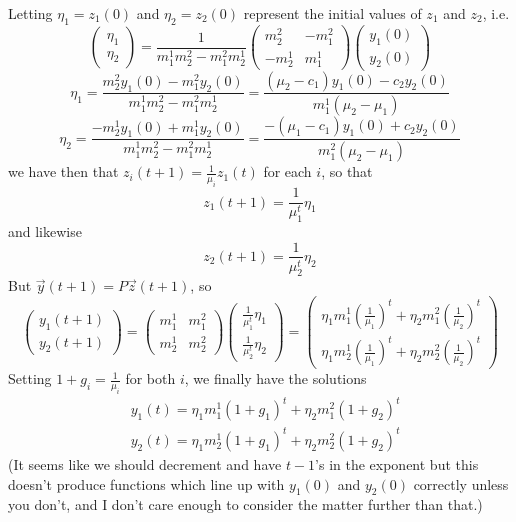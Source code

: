 \documentclass{article}
\theoremstyle{definition}
\theoremstyle{plain}
\theoremstyle{theorem}
\begin{document}
Letting $\eta_1 = z_1(0)$ and $\eta_2 = z_2(0)$ represent the initial values of $z_1$ and $z_2$, i.e.
\[ \begin{pmatrix} \eta_1 \\ \eta_2 \end{pmatrix} = \frac{1}{m^1_1m^2_2-m^2_1m^1_2} \begin{pmatrix} m^2_2 & -m^2_1 \\ -m^1_2 & m^1_1 \end{pmatrix} \begin{pmatrix} y_1(0) \\ y_2(0) \end{pmatrix} \]
\[ \eta_1 = \frac{m^2_2y_1(0)-m^2_1y_2(0)}{m^1_1m^2_2-m^2_1m^1_2} = \frac{(\mu_2-c_1)y_1(0)-c_2y_2(0)}{m^1_1(\mu_2-\mu_1)} \]
\[ \eta_2 = \frac{-m^1_2y_1(0)+m^1_1y_2(0)}{m^1_1m^2_2-m^2_1m^1_2} = \frac{-(\mu_1-c_1)y_1(0)+c_2y_2(0)}{m^2_1(\mu_2-\mu_1)} \]
 we have then that $z_i(t+1) = \frac{1}{\mu_i}z_1(t)$ for each $i$, so that 
\[ z_1(t+1) = \frac{1}{\mu_1^t}\eta_1 \]
and likewise
\[ z_2(t+1) = \frac{1}{\mu_2^t}\eta_2 \]
But $\vec{y}(t+1) = P\vec{z}(t+1)$, so 
\[ \begin{pmatrix} y_1(t+1) \\ y_2(t+1) \end{pmatrix} = \begin{pmatrix} m^1_1 & m^2_1 \\ m^1_2 & m^2_2 \end{pmatrix} \begin{pmatrix} \frac{1}{\mu_1^t}\eta_1 \\ \frac{1}{\mu_2^t}\eta_2 \end{pmatrix} = \begin{pmatrix} \eta_1 m_1^1 \left(\frac{1}{\mu_1} \right)^t + \eta_2 m_1^2 \left( \frac{1}{\mu_2} \right)^t \\ \eta_1 m^1_2\left(\frac{1}{\mu_1} \right)^t + \eta_2 m^2_2 \left( \frac{1}{\mu_2} \right)^t \end{pmatrix} \]
Setting $1 + g_i = \frac{1}{\mu_i}$ for both $i$, we finally have the solutions
\begin{align}
	& y_1(t) = \eta_1 m_1^1(1+g_1)^t + \eta_2 m_1^2 (1+g_2)^t \\
	& y_2(t) = \eta_1 m_2^1(1+g_1)^t + \eta_2 m_2^2 (1+g_2)^t
\end{align}
(It seems like we should decrement and have $t-1$'s in the exponent but this doesn't produce functions which line up with $y_1(0)$ and $y_2(0)$ correctly unless you don't, and I don't care enough to consider the matter further than that.)
\end{document}
